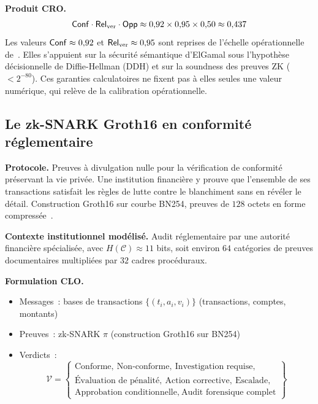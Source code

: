 \begin{sloppypar}
\noindent\textbf{Produit CRO.}
\begin{equation}
\mathsf{Conf} \cdot \mathsf{Rel}_{\mathrm{ver}} \cdot \mathsf{Opp}
\approx 0{,}92 \times 0{,}95 \times 0{,}50 \approx 0{,}437
\label{eq:produit_helios}
\end{equation}
Les valeurs $\mathsf{Conf} \approx 0{,}92$ et $\mathsf{Rel}_{\mathrm{ver}} \approx 0{,}95$ sont reprises de
l'\'echelle op\'erationnelle de~\cite{MINKA2026CLO}. Elles s'appuient sur la s\'ecurit\'e
s\'emantique d'ElGamal sous l'hypoth\`ese d\'ecisionnelle de Diffie-Hellman (DDH) et sur la soundness des preuves ZK
($< 2^{-80}$). Ces garanties calculatoires ne fixent pas \`a elles seules une valeur
num\'erique, qui rel\`eve de la calibration op\'erationnelle.

\subsection{Le zk-SNARK Groth16 en conformit\'e r\'eglementaire}
\label{sec:derivation_zksnark}

\noindent\textbf{Protocole.} Preuves \`a divulgation nulle pour la
v\'erification de conformit\'e pr\'eservant la vie priv\'ee. Une institution
financi\`ere y prouve que l'ensemble de ses transactions satisfait les r\`egles de
lutte contre le blanchiment sans en r\'ev\'eler le d\'etail. Construction
Groth16 sur courbe BN254, preuves de $128$ octets en forme compress\'ee~\cite{Groth16}.

\noindent\textbf{Contexte institutionnel mod\'elis\'e.} Audit r\'eglementaire
par une autorit\'e financi\`ere sp\'ecialis\'ee, avec
$H(\mathcal{C}) \approx 11$ bits, soit environ $64$ cat\'egories de preuves
documentaires multipli\'ees par $32$ cadres proc\'eduraux.

\noindent\textbf{Formulation CLO.}
\begin{itemize}
  \item Messages~: bases de transactions $\{(t_i, a_i, v_i)\}$
        (transactions, comptes, montants)
  \item Preuves~: zk-SNARK $\pi$ (construction Groth16 sur BN254)
  \item Verdicts~:
    \[
      \mathcal{V} = \left\{
      \begin{array}{l}
        \text{Conforme},\ \text{Non-conforme},\
        \text{Investigation requise},\\
        \text{\'Evaluation de p\'enalit\'e},\
        \text{Action corrective},\ \text{Escalade},\\
        \text{Approbation conditionnelle},\
        \text{Audit forensique complet}
      \end{array}
      \right\}
    \]
\end{itemize}


\end{sloppypar}
